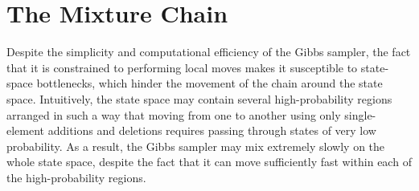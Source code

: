 
\section{The Mixture Chain}
Despite the simplicity and computational efficiency of the Gibbs sampler, the fact that it is constrained to performing local moves makes it susceptible to state-space bottlenecks, which hinder the movement of the chain around the state space.
Intuitively, the state space may contain several high-probability regions arranged in such a way that moving from one to another using only single-element additions and deletions requires passing through states of very low probability.
As a result, the Gibbs sampler may mix extremely slowly on the whole state space, despite the fact that it can move sufficiently fast within each of the high-probability regions.

